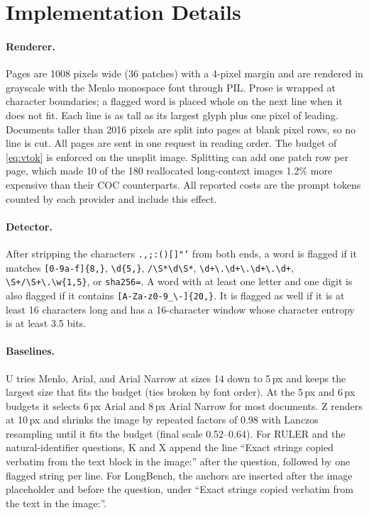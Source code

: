 \section{Implementation Details}
\label{app:impl}

\paragraph{Renderer.}
Pages are 1008 pixels wide (36 patches) with a 4-pixel margin and are rendered in grayscale with the Menlo monospace font through PIL.
Prose is wrapped at character boundaries; a flagged word is placed whole on the next line when it does not fit.
Each line is as tall as its largest glyph plus one pixel of leading.
Documents taller than 2016 pixels are split into pages at blank pixel rows, so no line is cut. All pages are sent in one request in reading order.
The budget of \cref{eq:vtok} is enforced on the unsplit image.
Splitting can add one patch row per page, which made 10 of the 180 reallocated long-context images 1.2\% more expensive than their COC counterparts.
All reported costs are the prompt tokens counted by each provider and include this effect.

\paragraph{Detector.}
After stripping the characters \texttt{.,;:()[]"'} from both ends, a word is flagged if it matches \verb![0-9a-f]{8,}!, \verb!\d{5,}!, \verb!/\S*\d\S*!, \verb!\d+\.\d+\.\d+\.\d+!, \verb!\S+/\S+\.\w{1,5}!, or \verb!sha256=!.
A word with at least one letter and one digit is also flagged if it contains \verb![A-Za-z0-9_\-]{20,}!.
It is flagged as well if it is at least 16 characters long and has a 16-character window whose character entropy is at least 3.5 bits.

\paragraph{Baselines.}
U tries Menlo, Arial, and Arial Narrow at sizes 14 down to 5\,px and keeps the largest size that fits the budget (ties broken by font order).
At the 5\,px and 6\,px budgets it selects 6\,px Arial and 8\,px Arial Narrow for most documents.
Z renders at 10\,px and shrinks the image by repeated factors of 0.98 with Lanczos resampling until it fits the budget (final scale 0.52--0.64).
For RULER and the natural-identifier questions, K and X append the line ``Exact strings copied verbatim from the text block in the image:'' after the question, followed by one flagged string per line.
For LongBench, the anchors are inserted after the image placeholder and before the question, under ``Exact strings copied verbatim from the text in the image:''.

